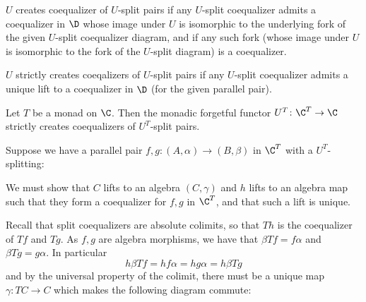         \item $U$ {\emphcolor creates coequalizer of $U$-split pairs} if any $U$-split coequalizer admits a coequalizer in $\D$ whose
        image under $U$ is isomorphic to the underlying fork of the given $U$-split coequalizer diagram, and if any such fork (whose image under $U$ is isomorphic
        to the fork of the $U$-split diagram) is a coequalizer.

        \item $U$ {\emphcolor strictly creates coeqalizers of $U$-split pairs} if any $U$-split coequalizer admits a unique lift to a coequalizer in $\D$ (for the given
        parallel pair).
    \eenum

\edefn

\bprop

    Let $T$ be a monad on $\C$.
    Then the monadic forgetful functor $U^T\colon\C^T\to\C$ strictly creates coequalizers of $U^T$-split pairs.

\eprop

\bproof

    Suppose we have a parallel pair $f,g\colon(A,\alpha)\to(B,\beta)$ in $\C^T$ with a $U^T$-splitting:

    \medskip
    \centerline{}
    \bigskip

    We must show that $C$ lifts to an algebra $(C,\gamma)$ and $h$ lifts to an algebra map such that they form a coequalizer for $f,g$ in $\C^T$,
    and that such a lift is unique.

    Recall that split coequalizers are absolute colimits, so that $Th$ is the coequalizer of $Tf$ and $Tg$.
    As $f,g$ are algebra morphisms, we have that $\beta Tf=f\alpha$ and $\beta Tg=g\alpha$.
    In particular
    $$ h\beta Tf = hf\alpha = hg\alpha = h\beta Tg $$
    and by the universal property of the colimit, there must be a unique map $\gamma\colon TC\to C$ which makes the following diagram commute:

    \bigskip
    \centerline{}

